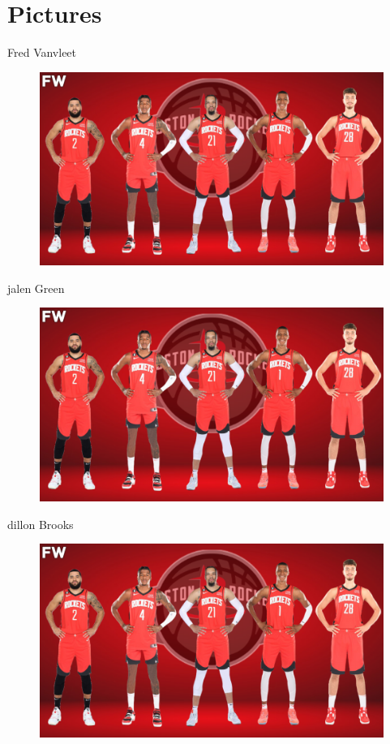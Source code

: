 
\section{Pictures}

\begin{frame}{Fred Vanvleet}
    \begin{figure}[h]
        \includegraphics[width=0.8\linewidth]{images/team.png}
        \label{fig:Team}
    \end{figure}
\end{frame}
\begin{frame}{jalen Green}
    \begin{figure}[h]
        \includegraphics[width=0.8\linewidth]{images/team.png}
        \label{fig:Team}
    \end{figure}
\end{frame}
\begin{frame}{dillon Brooks}
    \begin{figure}[h]
        \includegraphics[width=0.8\linewidth]{images/team.png}
        \label{fig:Team}
    \end{figure}
\end{frame}
